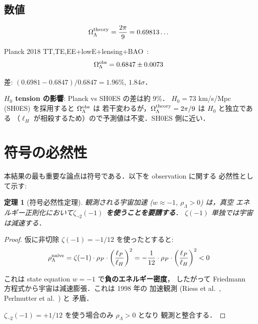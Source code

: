 \documentclass[11pt,a4paper]{article}
\newtheorem{theorem}{定理}
\begin{document}
\subsection{数値}

\begin{equation}
\Omega_\Lambda^{\rm theory} = \frac{2\pi}{9} = 0.69813\ldots
\end{equation}

Planck 2018 TT,TE,EE+lowE+lensing+BAO~\cite{Planck2018}:
\begin{equation}
\Omega_\Lambda^{\rm obs} = 0.6847 \pm 0.0073
\end{equation}

差: $(0.6981 - 0.6847)/0.6847 = 1.96\%$, $1.84\sigma$．

\textbf{$H_0$ tension の影響}: Planck vs SH0ES の差は約 9\%．
$H_0 = 73$ km/s/Mpc (SH0ES) を採用すると $\Omega_\Lambda^{\rm obs}$ は
若干変わるが，$\Omega_\Lambda^{\rm theory} = 2\pi/9$ は $H_0$ と独立である
（$\ell_H$ が相殺するため）ので予測値は不変．SH0ES 側に近い．

\section{符号の必然性}

本結果の最も重要な論点は符号である．以下を observation に関する
必然性として示す:

\begin{theorem}[符号必然性定理]
観測される宇宙加速 ($w \approx -1$, $\rho_\Lambda > 0$) は，真空
エネルギー正則化において\textbf{$\zeta_{\neg 2}(-1)$ を使うことを要請する}．
$\zeta(-1)$ 単独では宇宙は減速する．
\end{theorem}

\begin{proof}
仮に非切除 $\zeta(-1) = -1/12$ を使ったとすると:
\begin{equation}
\rho_\Lambda^{\rm naive} = \zeta(-1)\cdot\rho_P\cdot\left(\frac{\ell_P}{\ell_H}\right)^2
= -\frac{1}{12}\cdot\rho_P\cdot\left(\frac{\ell_P}{\ell_H}\right)^2 < 0
\end{equation}

これは state equation $w = -1$ で\textbf{負のエネルギー密度}，
したがって Friedmann 方程式から宇宙は減速膨張．これは 1998 年の
加速観測 (Riess et al.~\cite{Riess1998}, Perlmutter et al.~\cite{Perlmutter1999}) と
矛盾．

$\zeta_{\neg 2}(-1) = +1/12$ を使う場合のみ $\rho_\Lambda > 0$ となり
観測と整合する．
\end{proof}
\end{document}
